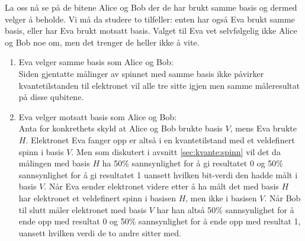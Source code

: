 La oss nå se på de bitene Alice og Bob der de har brukt samme basis og dermed velger å beholde. Vi må da studere to tilfeller: enten har også Eva brukt samme basis, eller har Eva brukt motsatt basis. Valget til Eva vet selvfølgelig ikke Alice og Bob noe om, men det trenger de heller ikke å vite. 
\begin{enumerate}
\item
Eva velger samme basis som Alice og Bob: \\
Siden gjentatte målinger av spinnet med samme basis ikke påvirker kvantetilstanden til elektronet vil alle tre sitte igjen men samme måleresultat på disse qubitene. 
\item
Eva velger motsatt basis som Alice og Bob: \\
Anta for konkrethets skyld at Alice og Bob brukte basis $V$, mens Eva brukte $H$. Elektronet Eva fanger opp er altså i en kvantetilstand med et veldefinert spinn i basis $V$. Men som diskutert i avsnitt \ref{sec:kvante:spinn} vil det da målingen med basis $H$ ha 50\% sannsynlighet for å gi resultatet 0 og 50\% sannsynlighet for å gi resultatet 1 uansett hvilken bit-verdi den hadde målt i basis $V$. Når Eva sender elektronet videre etter å ha målt det med basis $H$ har elektronet et veldefinert spinn i basisen $H$, men ikke i basisen $V$. Når Bob til slutt måler elektronet med basis $V$ har han altså 50\% sannsynlighet for å ende opp med resultat 0 og 50\% sannsynlighet for å ende opp med resultat 1, uansett hvilken verdi de to andre sitter med.
\end{enumerate}